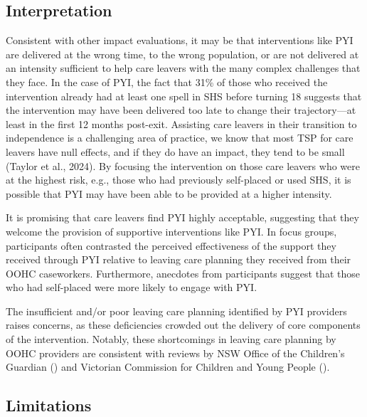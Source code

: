 \documentclass[
  jou,
  floatsintext,
  longtable,
  nolmodern,
  notxfonts,
  notimes,
  colorlinks=true,linkcolor=blue,citecolor=blue,urlcolor=blue]{apa7}
\begin{document}
\subsection{Interpretation}\label{interpretation}

Consistent with other impact evaluations, it may be that interventions
like PYI are delivered at the wrong time, to the wrong population, or
are not delivered at an intensity sufficient to help care leavers with
the many complex challenges that they face. In the case of PYI, the fact
that 31\% of those who received the intervention already had at least
one spell in SHS before turning 18 suggests that the intervention may
have been delivered too late to change their trajectory---at least in
the first 12 months post-exit. Assisting care leavers in their
transition to independence is a challenging area of practice, we know
that most TSP for care leavers have null effects, and if they do have an
impact, they tend to be small (Taylor et al., 2024). By focusing the
intervention on those care leavers who were at the highest risk, e.g.,
those who had previously self-placed or used SHS, it is possible that
PYI may have been able to be provided at a higher intensity.

It is promising that care leavers find PYI highly acceptable, suggesting
that they welcome the provision of supportive interventions like PYI. In
focus groups, participants often contrasted the perceived effectiveness
of the support they received through PYI relative to leaving care
planning they received from their OOHC caseworkers. Furthermore,
anecdotes from participants suggest that those who had self-placed were
more likely to engage with PYI.

The insufficient and/or poor leaving care planning identified by PYI
providers raises concerns, as these deficiencies crowded out the
delivery of core components of the intervention. Notably, these
shortcomings in leaving care planning by OOHC providers are consistent
with reviews by NSW Office of the Children's Guardian
()
and Victorian Commission for Children and Young People
().

\subsection{Limitations}\label{limitations}
\end{document}
